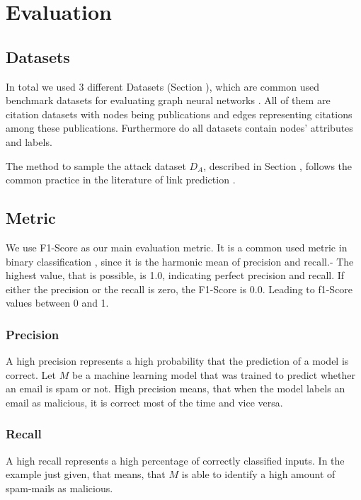 \chapter{Evaluation}

    \section{Datasets}
        In total we used 3 different Datasets (Section ), which are common used benchmark datasets for evaluating graph neural networks \cite{acharya2019feature, gao2019graphnas, gcn}.
        All of them are citation datasets with nodes being publications and edges representing citations among these publications.        
        Furthermore do all datasets contain nodes' attributes and labels.

        The method to sample the attack dataset $D_A$, described in Section , follows the common practice in the literature of link prediction \cite{BHPZ17, grover2016node2vec}.

    \section{Metric}
        We use F1-Score as our main evaluation metric.
        It is a common used metric in binary classification \cite{lipton2014thresholding, santus2016features, woodbridge2016predicting}, since it is the harmonic mean of precision and recall.-
        The highest value, that is possible, is 1.0, indicating perfect precision and recall.
        If either the precision or the recall is zero, the F1-Score is 0.0.
        Leading to f1-Score values between 0 and 1.

        \subsection*{Precision}
            A high precision represents a high probability that the prediction of a model is correct.
            Let $M$ be a machine learning model that was trained to predict whether an email is spam or not.
            High precision means, that when the model labels an email as malicious, it is correct most of the time and vice versa.

        \subsection*{Recall}
            A high recall represents a high percentage of correctly classified inputs.
            In the example just given, that means, that $M$ is able to identify a high amount of spam-mails as malicious.

